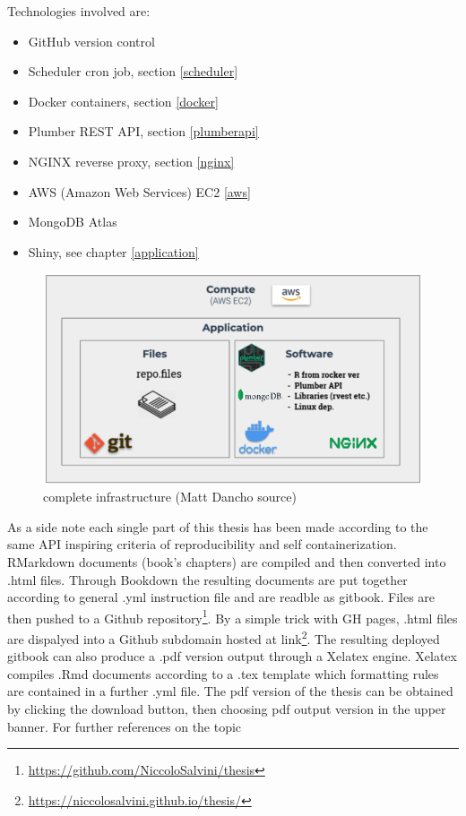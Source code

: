 \documentclass[
  12pt,
  a4paper,
  oneside]{book}
\DeclareRobustCommand{\href}[2]{#2\footnote{\url{#1}}}
\providecommand{\tightlist}{%
  \setlength{\itemsep}{0pt}\setlength{\parskip}{0pt}}
\begin{document}
Technologies involved are:

\begin{itemize}
\tightlist
\item
  GitHub version control
\item
  Scheduler cron job, section \ref{scheduler}
\item
  Docker containers, section \ref{docker}
\item
  Plumber REST API, section \ref{plumberapi}
\item
  NGINX reverse proxy, section \ref{nginx}
\item
  AWS (Amazon Web Services) EC2 \ref{aws}
\item
  MongoDB Atlas
\item
  Shiny, see chapter \ref{application}
\end{itemize}

\begin{figure}
\centering
\includegraphics{images/prova.PNG}
\caption{complete infrastructure (Matt Dancho source)}
\end{figure}

As a side note each single part of this thesis has been made according to the same API inspiring criteria of reproducibility and self containerization. RMarkdown \citep{rmarkdown1} documents (book's chapters) are compiled and then converted into .html files. Through Bookdown \citep{bookdown2} the resulting documents are put together according to general .yml instruction file and are readble as gitbook.
Files are then pushed to a \href{https://github.com/NiccoloSalvini/thesis}{Github repository}. By a simple trick with GH pages, .html files are dispalyed into a Github subdomain hosted at \href{https://niccolosalvini.github.io/thesis/}{link}. The resulting deployed gitbook can also produce a .pdf version output through a Xelatex engine. Xelatex compiles .Rmd documents according to a .tex template which formatting rules are contained in a further .yml file. The pdf version of the thesis can be obtained by clicking the download button, then choosing pdf output version in the upper banner. For further references on the topic \citet{bookdown2}
\end{document}
